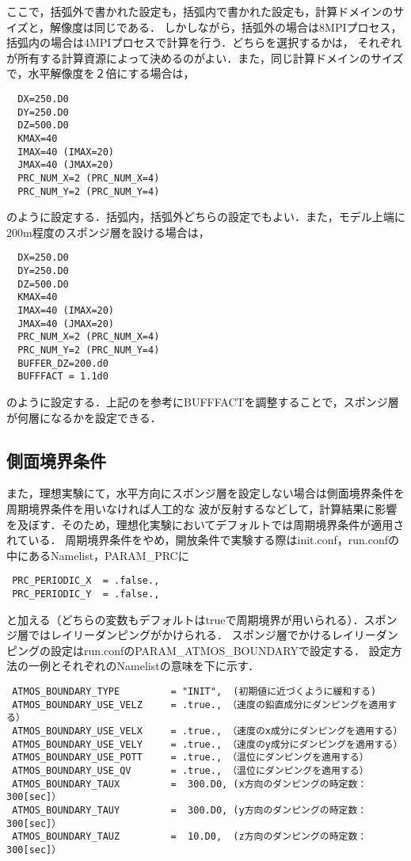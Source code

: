 ここで，括弧外で書かれた設定も，括弧内で書かれた設定も，計算ドメインのサイズと，解像度は同じである．
しかしながら，括弧外の場合は8MPIプロセス，括弧内の場合は4MPIプロセスで計算を行う．どちらを選択するかは，
それぞれが所有する計算資源によって決めるのがよい．また，同じ計算ドメインのサイズで，水平解像度を２倍にする場合は，

\begin{verbatim}
  DX=250.D0
  DY=250.D0
  DZ=500.D0
  KMAX=40
  IMAX=40 (IMAX=20)
  JMAX=40 (JMAX=20)
  PRC_NUM_X=2 (PRC_NUM_X=4)
  PRC_NUM_Y=2 (PRC_NUM_Y=4)
\end{verbatim}

のように設定する．括弧内，括弧外どちらの設定でもよい．また，モデル上端に200m程度のスポンジ層を設ける場合は，

\begin{verbatim}
  DX=250.D0
  DY=250.D0
  DZ=500.D0
  KMAX=40
  IMAX=40 (IMAX=20)
  JMAX=40 (JMAX=20)
  PRC_NUM_X=2 (PRC_NUM_X=4)
  PRC_NUM_Y=2 (PRC_NUM_Y=4)
  BUFFER_DZ=200.d0
  BUFFFACT = 1.1d0
\end{verbatim}

のように設定する．上記の\cite{eq3.1}を参考にBUFFFACTを調整することで，スポンジ層が何層になるかを設定できる．\\

\subsection{側面境界条件}
また，理想実験にて，水平方向にスポンジ層を設定しない場合は側面境界条件を周期境界条件を用いなければ人工的な
波が反射するなどして，計算結果に影響を及ぼす．そのため，理想化実験においてデフォルトでは周期境界条件が適用されている．
周期境界条件をやめ，開放条件で実験する際はinit.conf，run.confの中にあるNamelist，PARAM\_PRCに

\begin{verbatim}
 PRC_PERIODIC_X  = .false.,
 PRC_PERIODIC_Y  = .false.,
\end{verbatim}

と加える（どちらの変数もデフォルトはtrueで周期境界が用いられる）．スポンジ層ではレイリーダンピングがかけられる．
スポンジ層でかけるレイリーダンピングの設定はrun.confのPARAM\_ATMOS\_BOUNDARYで設定する．
設定方法の一例とそれぞれのNamelistの意味を下に示す．

\begin{verbatim}
 ATMOS_BOUNDARY_TYPE         = "INIT",  (初期値に近づくように緩和する)
 ATMOS_BOUNDARY_USE_VELZ     = .true., （速度の鉛直成分にダンピングを適用する）
 ATMOS_BOUNDARY_USE_VELX     = .true., （速度のx成分にダンピングを適用する）
 ATMOS_BOUNDARY_USE_VELY     = .true., （速度のy成分にダンピングを適用する）
 ATMOS_BOUNDARY_USE_POTT     = .true., （温位にダンピングを適用する）
 ATMOS_BOUNDARY_USE_QV       = .true., （温位にダンピングを適用する）
 ATMOS_BOUNDARY_TAUX         =  300.D0, (x方向のダンピングの時定数：300[sec]）
 ATMOS_BOUNDARY_TAUY         =  300.D0, (y方向のダンピングの時定数：300[sec]）
 ATMOS_BOUNDARY_TAUZ         =  10.D0,  (z方向のダンピングの時定数：300[sec]）
\end{verbatim}

